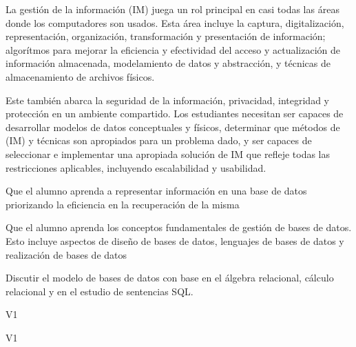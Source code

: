 \begin{syllabus}


\begin{justification}
La gestión de la información (IM) juega un rol principal en casi todas las áreas donde los computadores son usados. 
Esta área incluye la captura, digitalización, representación, organización, transformación y presentación de información; 
algorítmos para mejorar la eficiencia y efectividad del acceso y actualización de información almacenada, 
modelamiento de datos y abstracción, y técnicas de almacenamiento de archivos físicos.

Este también abarca la seguridad de la información, privacidad, integridad y protección en un ambiente compartido. 
Los estudiantes necesitan ser capaces de desarrollar modelos de datos conceptuales y físicos, determinar que métodos de (IM) y 
técnicas son apropiados para un problema dado, y ser capaces de seleccionar e implementar una apropiada solución de IM 
que refleje todas las restricciones aplicables, incluyendo escalabilidad y usabilidad.
\end{justification}

\begin{goals}
\item Que el alumno aprenda a representar información en una base de datos priorizando la eficiencia en la recuperación de la misma
\item Que el alumno aprenda los conceptos fundamentales de gestión de bases de datos. Esto incluye aspectos de diseño de bases de datos, lenguajes de bases de datos y realización de bases de datos
\item Discutir el modelo de bases de datos con base en el álgebra relacional, cálculo relacional y en el estudio de sentencias SQL.
\end{goals}

\begin{outcomes}{V1}
    \item {}
    \item {}
    \item {}
    \item {}
\end{outcomes}

\begin{competences}{V1}
    \item {} 
    \item {}
    \item {}
    \item {}
    \item {}
\end{competences}


\end{syllabus}
